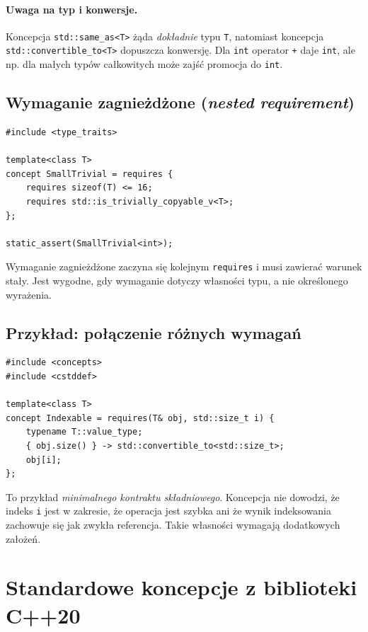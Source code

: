 \paragraph{Uwaga na typ i konwersje.}
Koncepcja \texttt{std::same\_as<T>} żąda \emph{dokładnie}
typu \texttt{T}, natomiast koncepcja
\texttt{std::convertible\_\allowbreak to<T>} dopuszcza konwersję.
Dla \texttt{int} operator \texttt{+} daje \texttt{int}, ale np.
dla małych typów całkowitych może zajść promocja do \texttt{int}.

\subsection{Wymaganie zagnieżdżone (\textit{nested requirement})}

\begin{lstlisting}
#include <type_traits>

template<class T>
concept SmallTrivial = requires {
    requires sizeof(T) <= 16;
    requires std::is_trivially_copyable_v<T>;
};

static_assert(SmallTrivial<int>);
\end{lstlisting}

Wymaganie zagnieżdżone zaczyna się kolejnym \texttt{requires}
i musi zawierać warunek stały. Jest wygodne, gdy wymaganie
dotyczy własności typu, a nie określonego wyrażenia.

\subsection{Przykład: połączenie różnych wymagań}

\begin{lstlisting}
#include <concepts>
#include <cstddef>

template<class T>
concept Indexable = requires(T& obj, std::size_t i) {
    typename T::value_type;
    { obj.size() } -> std::convertible_to<std::size_t>;
    obj[i];
};
\end{lstlisting}

To przykład \emph{minimalnego kontraktu składniowego}.
Koncepcja nie dowodzi, że indeks \texttt{i} jest w zakresie,
że operacja jest szybka ani że wynik indeksowania zachowuje się
jak zwykła referencja. Takie własności wymagają dodatkowych założeń.

\section{Standardowe koncepcje z biblioteki C++20}
\label{sec:concepts-standardowe}

